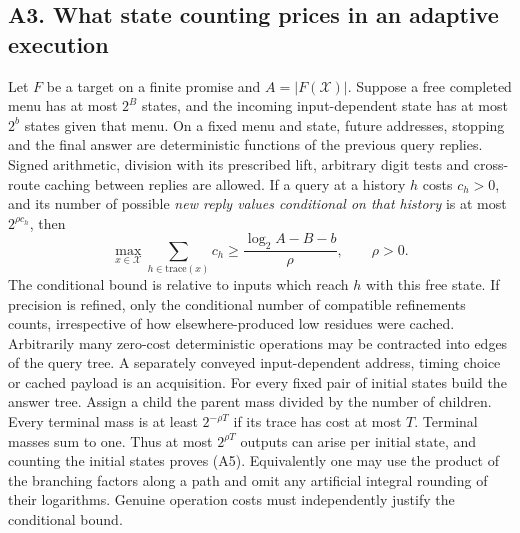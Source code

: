 \documentclass[
  11pt,
]{article}
\begin{document}
\subsection{A3. What state counting prices in an adaptive
execution}\label{v9-a3-what-state-counting-prices-in-an-adaptive-execution}

Let \(F\) be a target on a finite promise and \(A=|F(\mathcal X)|\).
Suppose a free completed menu has at most \(2^B\) states, and the
incoming input-dependent state has at most \(2^b\) states given that
menu. On a fixed menu and state, future addresses, stopping and the
final answer are deterministic functions of the previous query replies.
Signed arithmetic, division with its prescribed lift, arbitrary digit
tests and cross-route caching between replies are allowed. If a query at
a history \(h\) costs \(c_h>0\), and its number of possible \emph{new
reply values conditional on that history} is at most \(2^{\rho c_h}\),
then \[
             \max_{x\in\mathcal X}\sum_{h\in\mathrm{trace}(x)}c_h
             \ge \frac{\log_2 A-B-b}{\rho},\qquad \rho>0.
\tag{A5}
\] The conditional bound is relative to inputs which reach \(h\) with
this free state. If precision is refined, only the conditional number of
compatible refinements counts, irrespective of how elsewhere-produced
low residues were cached. Arbitrarily many zero-cost deterministic
operations may be contracted into edges of the query tree. A separately
conveyed input-dependent address, timing choice or cached payload is an
acquisition. For every fixed pair of initial states build the answer
tree. Assign a child the parent mass divided by the number of children.
Every terminal mass is at least \(2^{-\rho T}\) if its trace has cost at
most \(T\). Terminal masses sum to one. Thus at most \(2^{\rho T}\)
outputs can arise per initial state, and counting the initial states
proves (A5). Equivalently one may use the product of the branching
factors along a path and omit any artificial integral rounding of their
logarithms. Genuine operation costs must independently justify the
conditional bound.
\end{document}
